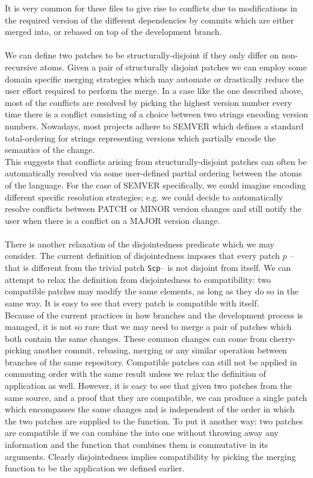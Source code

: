 \documentclass[11pt, titlepage]{article}
\newcommand{\toHaskell}[1]{\texttt{#1}\xspace}
\newcommand{\scp}{\toHaskell{Scp}}
\begin{document}
It is very common for these files to give rise to conflicts due to modifications in the required version of the different dependencies by commits which are either merged into, or rebased on top of the development branch. 
\\
\\
We can define two patches to be structurally-disjoint if they only differ on non-recursive atoms. Given a pair of structurally disjoint patches we can employ some domain specific merging strategies which may automate or drastically reduce the user effort required to perform the merge. In a case like the one described above, most of the conflicts are resolved by picking the highest version number every time there is a conflict consisting of a choice between two strings encoding version numbers. Nowadays, most projects adhere to SEMVER \cite{semver} which defines a standard total-ordering for strings representing versions which partially encode the semantics of the change. 
\\
This suggests that conflicts arising from structurally-disjoint patches can often be automatically resolved via some user-defined partial ordering between the atoms of the language. For the case of SEMVER specifically, we could imagine encoding different specific resolution strategies; e.g. we could decide to automatically resolve conflicts between PATCH or MINOR version changes and still notify the user when there is a conflict on a MAJOR version change.
\\
\\
There is another relaxation of the disjointedness predicate which we may consider. The current definition of disjointedness imposes that every patch $p$ -- that is different from the trivial patch \scp -- is not disjoint from itself. We can attempt to relax the definition from disjointedness to compatibility: two compatible patches may modify the same elements, as long as they do so in the same way. It is easy to see that every patch is compatible with itself.
\\
Because of the current practices in how branches and the development process is managed, it is not so rare that we may need to merge a pair of patches which both contain the same changes. These common changes can come from cherry-picking another commit, rebasing, merging or any similar operation between branches of the same repository. Compatible patches can still not be applied in commuting order with the same result unless we relax the definition of application as well. However, it is easy to see that given two patches from the same source, and a proof that they are compatible, we can produce a single patch which encompasses the same changes and is independent of the order in which the two patches are supplied to the function. To put it another way: two patches are compatible if we can combine the into one without throwing away any information and the function that combines them is commutative in its arguments.
Clearly disjointedness implies compatibility by picking the merging function to be the application we defined earlier.
\end{document}
